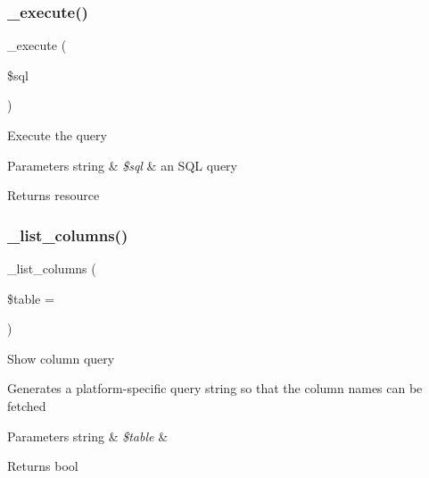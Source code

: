 \subsubsection{\texorpdfstring{\+\_\+execute()}{\_execute()}}
{\footnotesize\ttfamily \+\_\+execute (\begin{DoxyParamCaption}\item[{}]{\$sql }\end{DoxyParamCaption})\hspace{0.3cm}{\ttfamily [protected]}}

Execute the query


\begin{DoxyParams}[1]{Parameters}
string & {\em \$sql} & an S\+QL query \\
\hline
\end{DoxyParams}
\begin{DoxyReturn}{Returns}
resource 
\end{DoxyReturn}
\mbox{\label{class_c_i___d_b__sqlite__driver_a7ccb7f9c301fe7f0a9db701254142b63}} 
\subsubsection{\texorpdfstring{\+\_\+list\+\_\+columns()}{\_list\_columns()}}
{\footnotesize\ttfamily \+\_\+list\+\_\+columns (\begin{DoxyParamCaption}\item[{}]{\$table = {\ttfamily \textquotesingle{}\textquotesingle{}} }\end{DoxyParamCaption})\hspace{0.3cm}{\ttfamily [protected]}}

Show column query

Generates a platform-\/specific query string so that the column names can be fetched


\begin{DoxyParams}[1]{Parameters}
string & {\em \$table} & \\
\hline
\end{DoxyParams}
\begin{DoxyReturn}{Returns}
bool 
\end{DoxyReturn}
\mbox{\label{class_c_i___d_b__sqlite__driver_a435c0f3ce54fe7daa178baa8532ebd54}} 
